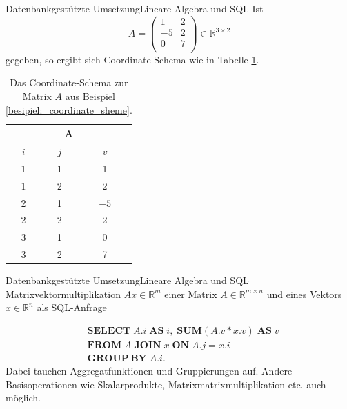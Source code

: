\documentclass[10pt]{beamer} %
\newcommand{\RR}{\ensuremath{\mathbb{R}}}
\begin{document}
\begin{frame}{Datenbankgestützte Umsetzung}{Lineare Algebra und SQL}
   Ist
    \begin{equation*}
        A=\begin{pmatrix}
            1 & 2 \\
            -5 & 2 \\
            0 & 7 \\
        \end{pmatrix}
        \in \RR^{3 \times 2}
    \end{equation*}
    gegeben, \pause so ergibt sich Coordinate-Schema wie in Tabelle \ref{coordinate_scheme_table}.

\begin{table}
    \centering
    \begin{tabular}{|c|c|c|} 
        \hline
    \multicolumn{3}{|c|}{\textbf{A}} \\ \hline
     \hline
     $i$ &$j$ &$v$ \\ 
     \hline
     1 &1 &1\\ 
     \hline
     1 &2 &2\\
     \hline
     2 &1 &$-5$\\
     \hline
     2 &2 &2\\
     \hline
     3 &1 &0\\
     \hline
     3 &2 &7\\
     \hline
    \end{tabular}
    \caption[Das Coordinate-Schema]{Das Coordinate-Schema zur Matrix $A$ aus Beispiel \ref{besipiel:_coordinate_sheme}.}
    \label{coordinate_scheme_table}
\end{table}

\end{frame}

\begin{frame}{Datenbankgestützte Umsetzung}{Lineare Algebra und SQL}
   Matrixvektormultiplikation $Ax \in \RR^m$ einer Matrix $A \in \RR^{m \times n}$ und eines Vektors $x \in \RR^n$ als SQL-Anfrage

\begin{align*}
    & \mathbf{SELECT} \; A.i \; \mathbf{AS} \; i, \; \mathbf{SUM} (A.v*x.v) \; \mathbf{AS} \; v\\
    & \mathbf{FROM} \; A \; \mathbf{JOIN} \; x \; \mathbf{ON} \; A.j=x.i \; \\
    & \mathbf{GROUP} \, \mathbf{BY} \; A.i.
\end{align*}
\pause
Dabei tauchen Aggregatfunktionen und Gruppierungen auf. Andere Basisoperationen wie Skalarprodukte, Matrixmatrixmultiplikation etc. auch möglich.
\end{frame}
\end{document}
